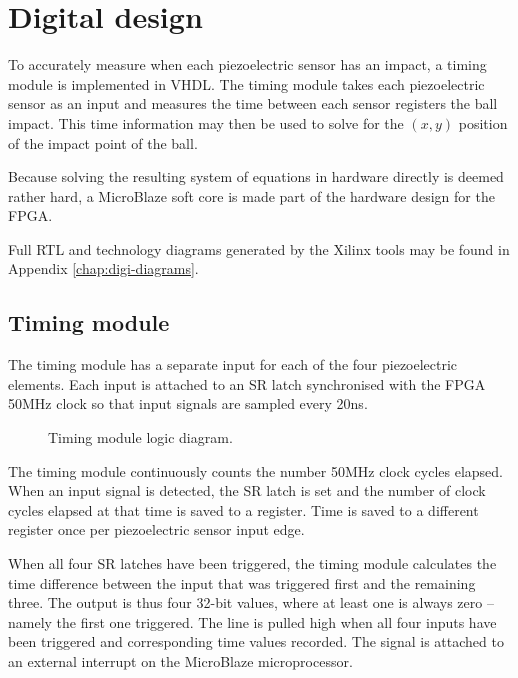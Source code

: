 \section{Digital design}
\label{cha:digidesign}

To accurately measure when each piezoelectric sensor has an impact, %
a timing module is implemented in VHDL.
The timing module takes each piezoelectric sensor as an input and measures the time between each sensor registers the ball impact.
This time information may then be used to solve for the $(x,y)$ position of the impact point of the ball.

Because solving the resulting system of equations in hardware directly is deemed rather hard, %
 a MicroBlaze soft core is made part of the hardware design for the FPGA.

 Full RTL and technology diagrams generated by the Xilinx tools may be found in Appendix \ref{chap:digi-diagrams}.

\subsection{Timing module}
\label{sec:timing_module}
The timing module has a separate input for each of the four piezoelectric elements.
Each input is attached to an SR latch synchronised with the FPGA 50\si{MHz} clock so that input signals are sampled every 20\si{ns}.

\begin{figure}[htb]
    \centering
    
    \caption{Timing module logic diagram.}
    \label{fig:timing}
\end{figure}

The timing module continuously counts the number 50\si{MHz} clock cycles elapsed.
When an input signal is detected, the SR latch is set and the number of clock cycles elapsed at that time is saved to a register.
Time is saved to a different register once per piezoelectric sensor input edge.

When all four SR latches have been triggered, the timing module calculates the time difference between the input that was triggered first and the remaining three.
The output is thus four 32-bit values, where at least one is always zero -- namely the first one triggered.
The line  is pulled high when all four inputs have been triggered and corresponding time values recorded.
The  signal is attached to an external interrupt on the MicroBlaze microprocessor.

